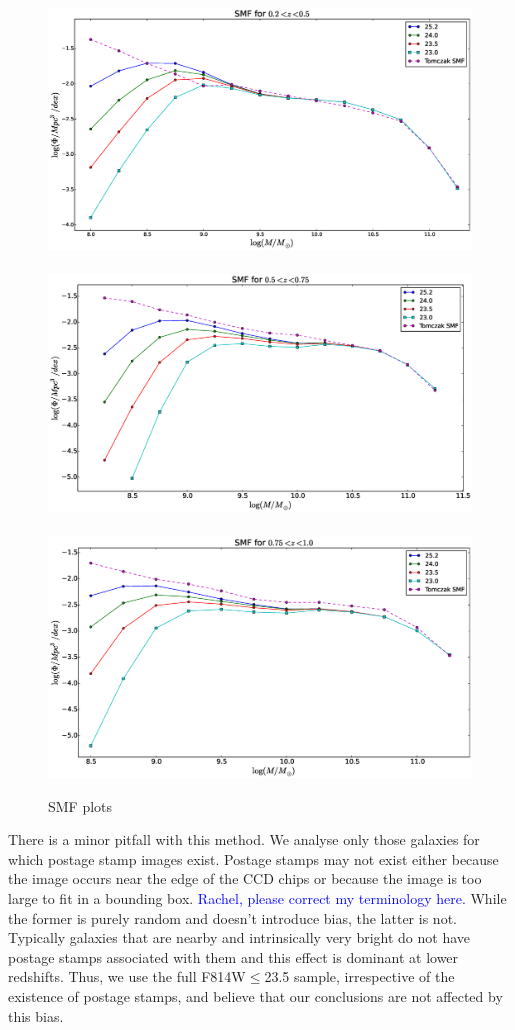 \documentclass[twocolumn,useAMS,usenatbib]{mn2e}
\newcommand{\arun}[1]{{\textcolor{blue}{#1}}}
\begin{document}
\begin{figure}
 \centering
 \includegraphics[width=0.66\columnwidth]{SMF1} \
 \includegraphics[width=0.66\columnwidth]{SMF2} \
 \includegraphics[width=0.66\columnwidth]{SMF3}
 \caption{SMF plots}
 \label{fig:smf}
\end{figure}

There is a minor pitfall with this method. We analyse only those galaxies for which postage stamp images exist.
Postage stamps may not exist either because the image occurs near the edge of the CCD chips or because the image is too large to fit in a bounding box. \arun{Rachel, please correct my terminology here.}
While the former is purely random and doesn't introduce bias, the latter is not. Typically galaxies that are nearby and intrinsically very bright do not have postage stamps associated with them and this effect is dominant at lower redshifts. 
Thus, we use the full F814W$\le$23.5 sample, irrespective of the existence of postage stamps, and believe that our conclusions are not affected by this bias.
\end{document}
